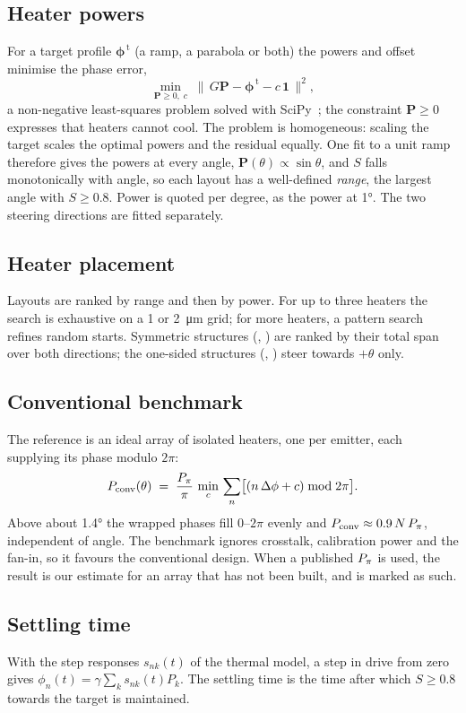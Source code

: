 \subsection{Heater powers}
\label{sec:fit}

For a target profile $\bm\phi^{\,\mathrm t}$ (a ramp, a parabola or both) the powers and offset minimise the phase
error,
\begin{equation}
  \min_{\bm P\ge 0,\;c}\;\bigl\lVert\, G\bm P - \bm\phi^{\,\mathrm t} - c\,\bm 1 \,\bigr\rVert^{2},
  \label{eq:nnls}
\end{equation}
a non-negative least-squares problem solved with SciPy~\cite{scipy2020}; the constraint
$\bm P\ge0$ expresses that heaters cannot cool. The problem is homogeneous: scaling the target scales the optimal
powers and the residual equally. One fit to a unit ramp therefore gives the powers at every angle,
$\bm P(\theta)\propto\sin\theta$, and $S$ falls monotonically with angle, so each layout has a well-defined
\emph{range}, the largest angle with $S\ge0.8$. Power is quoted per degree, as the power at \ang{1}. The two
steering directions are fitted separately.

\subsection{Heater placement}
\label{sec:placement}

Layouts are ranked by range and then by power. For up to three heaters the search is exhaustive on a
\qty{1}{} or \qty{2}{\micro\metre} grid; for more heaters, a pattern search refines random starts. Symmetric
structures (, ) are ranked by their total span over both directions; the
one-sided structures (, ) steer towards $+\theta$ only.

\subsection{Conventional benchmark}
\label{sec:conventional}

The reference is an ideal array of isolated heaters, one per emitter, each supplying its phase modulo $2\pi$:
\begin{equation}
  P_\mathrm{conv}(\theta) \;=\; \frac{P_{\pi}}{\pi}\,\min_{c}\,\sum_{n}\bigl[(n\,\Delta\phi + c)\bmod 2\pi\bigr].
  \label{eq:conv}
\end{equation}
Above about \ang{1.4} the wrapped phases fill $0$--$2\pi$ evenly and $P_\mathrm{conv}\approx0.9\,N\,P_{\pi}$,
independent of angle. The benchmark ignores crosstalk, calibration power and the fan-in, so it favours the
conventional design. When a published $P_{\pi}$ is used, the result is our estimate for an array that has not been
built, and is marked as such.

\subsection{Settling time}
\label{sec:settlemethod}

With the step responses $s_{nk}(t)$ of the thermal model, a step in drive from zero gives
$\phi_n(t)=\gamma\sum_k s_{nk}(t)P_k$. The settling time is the time after which $S\ge0.8$ towards the target is
maintained.
